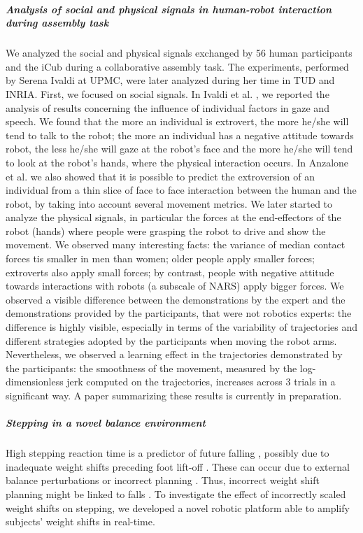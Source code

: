 \subparagraph*{Analysis of social and physical signals in human-robot interaction during assembly task}

We analyzed the social and physical signals exchanged by 56 human participants and the iCub during a collaborative assembly task. The experiments, performed by Serena Ivaldi at UPMC, were later analyzed during her time in TUD and INRIA.
First, we focused on social signals. In Ivaldi et al. \cite{ivaldi2016}, we reported the analysis of results concerning the influence of individual factors in gaze and speech. We found that the more an individual is extrovert, the more he/she will tend to talk to the robot; the more an individual has a negative attitude towards robot, the less he/she will gaze at the robot’s face and the more he/she will tend to look at the robot’s hands, where the physical interaction occurs. In Anzalone et al. \cite{Anzalone2017} we also showed that it is possible to predict the extroversion of an individual from a thin slice of face to face interaction between the human and the robot, by taking into account several movement metrics.
We later started to analyze the physical signals, in particular the forces at the end-effectors of the robot (hands) where people were grasping the robot to drive and show the movement. We observed many interesting facts: the variance of median contact forces tis smaller in men than women; older people apply smaller forces; extroverts also apply small forces; by contrast, people with negative attitude towards interactions with robots (a subscale of NARS) apply bigger forces. We observed a visible difference between the demonstrations by the expert and the demonstrations provided by the participants, that were not robotics experts: the difference is highly visible, especially in terms of the variability of trajectories and different strategies adopted by the participants when moving the robot arms. Nevertheless, we observed a learning effect in the trajectories demonstrated by the participants: the smoothness of the movement, measured by the log-dimensionless jerk computed on the trajectories, increases across 3 trials in a significant way. A paper summarizing these results is currently in preparation.

\subparagraph*{Stepping in a novel balance environment}
High stepping reaction time is a predictor of future falling \cite{Lord2001}, possibly due to inadequate weight shifts preceding foot lift-off \cite{Cohen2011}\cite{Sparto2013}. These can occur due to external balance perturbations \cite{Mille2014} or incorrect planning \cite{Cohen2011}\cite{Sparto2013}. Thus, incorrect weight shift planning might be linked to falls \cite{Robinovitch2013}. To investigate the effect of incorrectly scaled weight shifts on stepping, we developed a novel robotic platform able to amplify subjects’ weight shifts in real-time.

